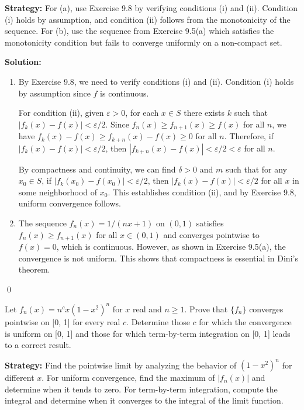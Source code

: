 \noindent\textbf{Strategy:} For (a), use Exercise 9.8 by verifying conditions (i) and (ii). Condition (i) holds by assumption, and condition (ii) follows from the monotonicity of the sequence. For (b), use the sequence from Exercise 9.5(a) which satisfies the monotonicity condition but fails to converge uniformly on a non-compact set.

\bigskip\noindent\textbf{Solution:}
\begin{enumerate}[label=(\alph*)]
\item By Exercise 9.8, we need to verify conditions (i) and (ii). Condition (i) holds by assumption since \( f \) is continuous.

For condition (ii), given \( \varepsilon > 0 \), for each \( x \in S \) there exists \( k \) such that \( |f_k(x) - f(x)| < \varepsilon/2 \). Since \( f_n(x) \geq f_{n+1}(x) \geq f(x) \) for all \( n \), we have \( f_k(x) - f(x) \geq f_{k+n}(x) - f(x) \geq 0 \) for all \( n \). Therefore, if \( |f_k(x) - f(x)| < \varepsilon/2 \), then \( |f_{k+n}(x) - f(x)| < \varepsilon/2 < \varepsilon \) for all \( n \).

By compactness and continuity, we can find \( \delta > 0 \) and \( m \) such that for any \( x_0 \in S \), if \( |f_k(x_0) - f(x_0)| < \varepsilon/2 \), then \( |f_k(x) - f(x)| < \varepsilon/2 \) for all \( x \) in some neighborhood of \( x_0 \). This establishes condition (ii), and by Exercise 9.8, uniform convergence follows.

\item The sequence \( f_n(x) = 1/(nx + 1) \) on \( (0, 1) \) satisfies \( f_n(x) \geq f_{n+1}(x) \) for all \( x \in (0, 1) \) and converges pointwise to \( f(x) = 0 \), which is continuous. However, as shown in Exercise 9.5(a), the convergence is not uniform. This shows that compactness is essential in Dini's theorem.
\end{enumerate}\qed


\begin{problembox}
Let \( f_n(x) = n^c x(1 - x^2)^n \) for \( x \) real and \( n \geq 1 \). Prove that \( \{f_n\} \) converges pointwise on [0, 1] for every real \( c \). Determine those \( c \) for which the convergence is uniform on [0, 1] and those for which term-by-term integration on [0, 1] leads to a correct result.
\end{problembox}

\noindent\textbf{Strategy:} Find the pointwise limit by analyzing the behavior of \( (1 - x^2)^n \) for different \( x \). For uniform convergence, find the maximum of \( |f_n(x)| \) and determine when it tends to zero. For term-by-term integration, compute the integral and determine when it converges to the integral of the limit function.

